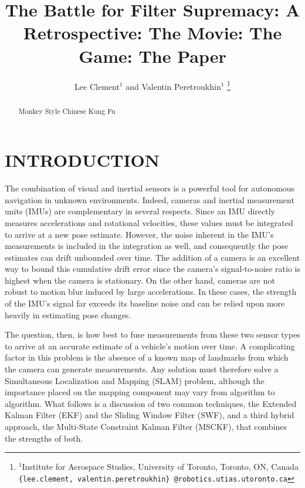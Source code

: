 \documentclass[letterpaper, 10 pt, conference]{ieeeconf}  %
\title{\LARGE \bf
The Battle for Filter Supremacy: A Retrospective: The Movie: The Game: The Paper
}
\author{Lee Clement$^{1}$ and Valentin Peretroukhin$^{1}$%
\thanks{$^{1}$Institute for Aerospace Studies,
        University of Toronto, Toronto, ON, Canada
        {\tt \{lee.clement, valentin.peretroukhin\} @robotics.utias.utoronto.ca}
        }%
}
\begin{document}
\maketitle
\thispagestyle{empty}
\pagestyle{empty}


\begin{abstract}

Monkey Style Chinese Kung Fu

\end{abstract}


\section{INTRODUCTION} \label{sec:introduction}

The combination of visual and inertial sensors is a powerful tool for autonomous navigation in unknown environments.
Indeed, cameras and inertial measurement units (IMUs) are complementary in several respects.
Since an IMU directly measures accelerations and rotational velocities, these values must be integrated to arrive at a new pose estimate.
However, the noise inherent in the IMU's measurements is included in the integration as well, and consequently the pose estimates can drift unbounded over time.
The addition of a camera is an excellent way to bound this cumulative drift error since the camera's signal-to-noise ratio is highest when the camera is stationary.
On the other hand, cameras are not robust to motion blur induced by large accelerations.
In these cases, the strength of the IMU's signal far exceeds its baseline noise and can be relied upon more heavily in estimating pose changes.

The question, then, is how best to fuse measurements from these two sensor types to arrive at an accurate estimate of a vehicle's motion over time.
A complicating factor in this problem is the absence of a known map of landmarks from which the camera can generate measurements.
Any solution must therefore solve a Simultaneous Localization and Mapping (SLAM) problem, although the importance placed on the mapping component may vary from algorithm to algorithm.
What follows is a discussion of two common techniques, the Extended Kalman Filter (EKF) and the Sliding Window Filter (SWF), and a third hybrid approach, the Multi-State Constraint Kalman Filter (MSCKF), that combines the strengths of both.
\end{document}
